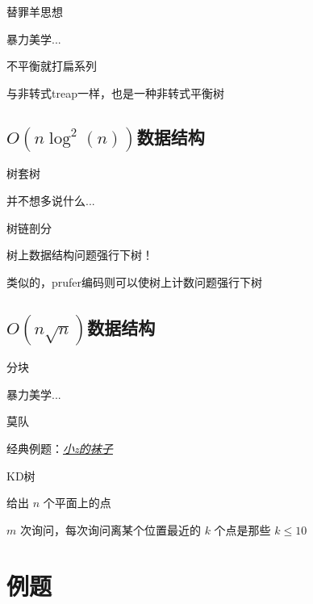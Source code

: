 \documentclass[UTF8]{beamer}
\begin{document}
			\begin{frame}{替罪羊思想}

			暴力美学...

			不平衡就打扁系列

			与非转式treap一样，也是一种非转式平衡树

			\end{frame}

		\subsection{$O(n\log^2(n))$数据结构}

			\begin{frame}{树套树}

			并不想多说什么...

			\end{frame}

			\begin{frame}{树链剖分}

			树上数据结构问题强行下树！

			类似的，prufer编码则可以使树上计数问题强行下树

			\end{frame}

		\subsection{$O(n\sqrt n)$数据结构}

			\begin{frame}{分块}

			暴力美学...

			\end{frame}

			\begin{frame}{莫队}

			经典例题：\href{http://hzwer.com/2782.html}{\emph{\underline{小z的袜子}}}

			\end{frame}

			\begin{frame}{KD树}

			给出 $n$ 个平面上的点

			$m$ 次询问，每次询问离某个位置最近的 $k$ 个点是那些 $k \le 10$

			\end{frame}

	\section{例题}
\end{document}
